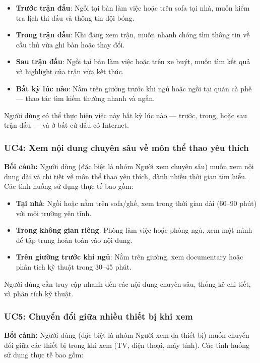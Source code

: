 \begin{itemize}
    \item \textbf{Trước trận đấu}: Ngồi tại bàn làm việc hoặc trên sofa tại nhà, muốn kiểm tra lịch thi đấu và thông tin đội bóng.
    \item \textbf{Trong trận đấu}: Khi đang xem trận, muốn nhanh chóng tìm thông tin về cầu thủ vừa ghi bàn hoặc thay đổi.
    \item \textbf{Sau trận đấu}: Ngồi tại bàn làm việc hoặc trên xe buýt, muốn tìm kết quả và highlight của trận vừa kết thúc.
    \item \textbf{Bất kỳ lúc nào}: Nằm trên giường trước khi ngủ hoặc ngồi tại quán cà phê --- thao tác tìm kiếm thường nhanh và ngắn.
\end{itemize}

Người dùng có thể thực hiện việc này bất kỳ lúc nào --- trước, trong, hoặc sau trận đấu --- và ở bất cứ đâu có Internet.

\subsubsection{UC4: Xem nội dung chuyên sâu về môn thể thao yêu thích}

\textbf{Bối cảnh:} Người dùng (đặc biệt là nhóm Người xem chuyên sâu) muốn xem nội dung dài và chi tiết về môn thể thao yêu thích, dành nhiều thời gian tìm hiểu. Các tình huống sử dụng thực tế bao gồm:

\begin{itemize}
    \item \textbf{Tại nhà}: Ngồi hoặc nằm trên sofa/ghế, xem trong thời gian dài (60--90 phút) với môi trường yên tĩnh.
    \item \textbf{Trong không gian riêng}: Phòng làm việc hoặc phòng ngủ, xem một mình để tập trung hoàn toàn vào nội dung.
    \item \textbf{Trên giường trước khi ngủ}: Nằm trên giường, xem documentary hoặc phân tích kỹ thuật trong 30--45 phút.
\end{itemize}

Người dùng cần truy cập nhanh đến các nội dung chuyên sâu, thống kê chi tiết, và phân tích kỹ thuật.

\subsubsection{UC5: Chuyển đổi giữa nhiều thiết bị khi xem}

\textbf{Bối cảnh:} Người dùng (đặc biệt là nhóm Người xem đa thiết bị) muốn chuyển đổi giữa các thiết bị trong khi xem (TV, điện thoại, máy tính). Các tình huống sử dụng thực tế bao gồm:

